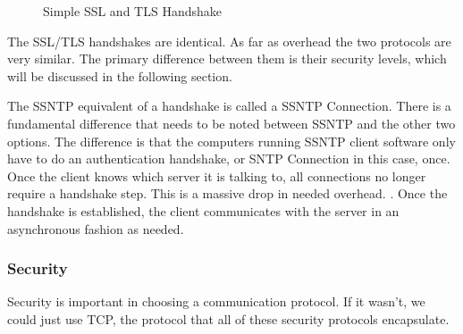 \documentclass[10pt,letterpaper,onecolumn,journal]{IEEEtran}
\begin{document}
\begin{figure}[H]
	\begin{center}
		\caption{Simple SSL and TLS Handshake\cite{ibm-diagram}}
	\end{center}
\end{figure}

The SSL/TLS handshakes are identical. As far as overhead the two protocols
are very similar. The primary difference between them is their security levels,
which will be discussed in the following section.

The SSNTP equivalent of a handshake is called a SSNTP Connection. There is a
fundamental difference that needs to be noted between SSNTP and the other two
options. The difference is that the computers running SSNTP client software
only have to do an authentication handshake, or SNTP Connection in this case,
once. Once the client knows which server it is talking to, all connections
no longer require a handshake step. This is a massive drop in needed overhead.
\cite{ssntp}. Once the handshake is established, the client communicates with
the server in an asynchronous fashion as needed.

\subsubsection{Security}
Security is important in choosing a communication protocol. If it wasn't, we
could just use TCP, the protocol that all of these security protocols
encapsulate.
\end{document}
